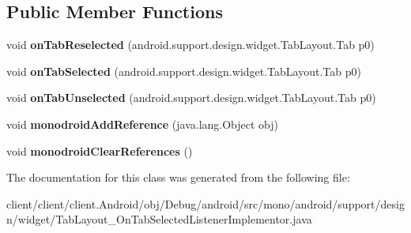 \subsection*{Public Member Functions}
\begin{DoxyCompactItemize}
\item 
\hypertarget{classmono_1_1android_1_1support_1_1design_1_1widget_1_1TabLayout__OnTabSelectedListenerImplementor_a7ec2a49269664d99cb90d0e2a341da9d}{}void {\bfseries on\+Tab\+Reselected} (android.\+support.\+design.\+widget.\+Tab\+Layout.\+Tab p0)\label{classmono_1_1android_1_1support_1_1design_1_1widget_1_1TabLayout__OnTabSelectedListenerImplementor_a7ec2a49269664d99cb90d0e2a341da9d}

\item 
\hypertarget{classmono_1_1android_1_1support_1_1design_1_1widget_1_1TabLayout__OnTabSelectedListenerImplementor_ae5e2165f79658a8e289dff880f9eeeec}{}void {\bfseries on\+Tab\+Selected} (android.\+support.\+design.\+widget.\+Tab\+Layout.\+Tab p0)\label{classmono_1_1android_1_1support_1_1design_1_1widget_1_1TabLayout__OnTabSelectedListenerImplementor_ae5e2165f79658a8e289dff880f9eeeec}

\item 
\hypertarget{classmono_1_1android_1_1support_1_1design_1_1widget_1_1TabLayout__OnTabSelectedListenerImplementor_ac7d1b1a44df7eb306b35a80be1ef03bd}{}void {\bfseries on\+Tab\+Unselected} (android.\+support.\+design.\+widget.\+Tab\+Layout.\+Tab p0)\label{classmono_1_1android_1_1support_1_1design_1_1widget_1_1TabLayout__OnTabSelectedListenerImplementor_ac7d1b1a44df7eb306b35a80be1ef03bd}

\item 
\hypertarget{classmono_1_1android_1_1support_1_1design_1_1widget_1_1TabLayout__OnTabSelectedListenerImplementor_ac366225a0b919fe8a7df0dce363784e6}{}void {\bfseries monodroid\+Add\+Reference} (java.\+lang.\+Object obj)\label{classmono_1_1android_1_1support_1_1design_1_1widget_1_1TabLayout__OnTabSelectedListenerImplementor_ac366225a0b919fe8a7df0dce363784e6}

\item 
\hypertarget{classmono_1_1android_1_1support_1_1design_1_1widget_1_1TabLayout__OnTabSelectedListenerImplementor_ad3e27d3383e787abab61553c3ff8efba}{}void {\bfseries monodroid\+Clear\+References} ()\label{classmono_1_1android_1_1support_1_1design_1_1widget_1_1TabLayout__OnTabSelectedListenerImplementor_ad3e27d3383e787abab61553c3ff8efba}

\end{DoxyCompactItemize}


The documentation for this class was generated from the following file\+:\begin{DoxyCompactItemize}
\item 
client/client/client.\+Android/obj/\+Debug/android/src/mono/android/support/design/widget/Tab\+Layout\+\_\+\+On\+Tab\+Selected\+Listener\+Implementor.\+java\end{DoxyCompactItemize}
